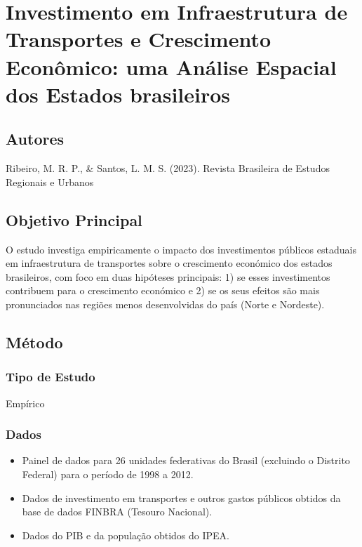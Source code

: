 \documentclass[12pt]{article}
\begin{document}
\section{Investimento em Infraestrutura de Transportes e Crescimento Econômico: uma Análise Espacial dos Estados brasileiros}

\subsection*{Autores}
Ribeiro, M. R. P., \& Santos, L. M. S. (2023). Revista Brasileira de Estudos Regionais e Urbanos

\subsection*{Objetivo Principal}
O estudo investiga empiricamente o impacto dos investimentos públicos estaduais em infraestrutura de transportes sobre o crescimento económico dos estados brasileiros, com foco em duas hipóteses principais: 1) se esses investimentos contribuem para o crescimento económico e 2) se os seus efeitos são mais pronunciados nas regiões menos desenvolvidas do país (Norte e Nordeste).

\subsection*{Método}

\subsubsection*{Tipo de Estudo}
Empírico

\subsubsection*{Dados}
\begin{itemize}
    \item Painel de dados para 26 unidades federativas do Brasil (excluindo o Distrito Federal) para o período de 1998 a 2012.
    \item Dados de investimento em transportes e outros gastos públicos obtidos da base de dados FINBRA (Tesouro Nacional).
    \item Dados do PIB e da população obtidos do IPEA.
\end{itemize}
\end{document}
